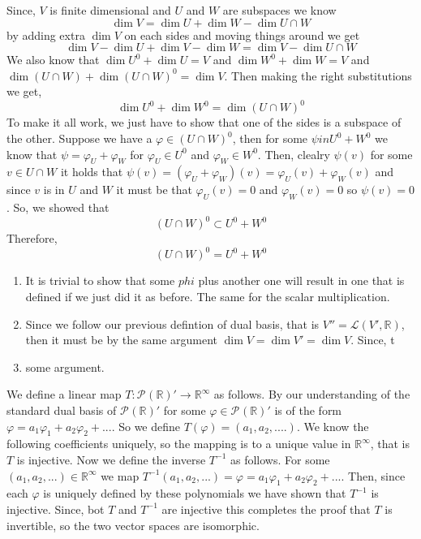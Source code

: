 \documentclass[10pt, twocolumn]{article}
\newcommand{\R}{\mathbb{R}}
\newcommand{\LinearMap}[2]{\mathcal{L}(#1, #2)}
\newcommand{\poly}[2]{\mathcal{P}_{#1}\left(#2\right)}
\newcommand{\inv}[1]{#1^{-1}}
\newcommand{\annhilator}[1]{#1^{0}}
\begin{document}
\begin{q}[23]
    Since, $ V $ is finite dimensional and $ U $ and $ W $ are subspaces we know 
    $$ \dim V = \dim U + \dim W - \dim U \cap W $$
    by adding extra $ \dim V $ on each sides and moving things around we get
    $$ \dim V - \dim U + \dim V - \dim W = \dim V - \dim U \cap W $$
    We also know that $ \dim \annhilator{U} + \dim U = V $ and $ \dim \annhilator{W} + \dim W = V $ and 
    $ \dim (U \cap W) + \dim \annhilator{(U \cap W)} = \dim V $. 
    Then making the right substitutions we get, 
    $$ \dim \annhilator{U} + \dim \annhilator{W} = \dim \annhilator{(U \cap W)} $$
    To make it all work, we just have to show that one of the sides is a subspace of the other. 
    Suppose we have a $ \varphi \in (U \cap W)^0 $, then for some $ \psi in U^0 + W^0 $ we know that $ \psi = \varphi_U + \varphi_W $ for $ \varphi_U \in \annhilator{U}  $ and $ \varphi_W \in \annhilator{W} $. 
    Then, clealry $ \psi(v) $ for some $ v\in U \cap W $ it holds that $ \psi(v) = (\varphi_U + \varphi_W)(v) = \varphi_U(v) + \varphi_W(v) $ and since $ v $ is in $ U $ and $ W $ it must be that $ \varphi_U(v) = 0 $ and $ \varphi_W(v) = 0 $ so $ \psi(v) = 0 $. 
    So, we showed that 
    $$ (U \cap W)^0  \subset U^0 + W^0 $$
    Therefore, 
    $$ (U \cap W)^0  = U^0 + W^0 $$
\end{q}
\begin{q}[34]
    \begin{enumerate}
        \item It is trivial to show that some $ phi $ plus another one will result in one that is defined if we just did it as before. The same for the scalar multiplication. 
        \item Since we follow our previous defintion of dual basis, that is $ V'' = \LinearMap{V'}{\R} $, then it must be by the same argument $ \dim V = \dim V' = \dim V $. Since, t
        \item some argument.
    \end{enumerate} 
\end{q}
\begin{q}[35]
    We define a linear map $ T : \poly{}{\R}' \to \R^\infty $ as follows. 
    By our understanding of the standard dual basis of $ \poly{}{\R}' $ for some $ \varphi \in \poly{}{\R}' $ is of the form $ \varphi = a_1 \varphi_1 + a_2 \varphi_2 + ... $. 
    So we define $ T(\varphi) = (a_1, a_2, ....) $. We know the following coefficients uniquely, so the mapping is to a unique value in $ \R^\infty $, that is $ T $ is injective. 
    Now we define the inverse $ \inv{T} $ as follows. 
    For some $ (a_1, a_2, ...) \in \R^\infty $ we map $ \inv{T} (a_1, a_2, ...) = \varphi = a_1 \varphi_1 + a_2 \varphi_2 + ... $. 
    Then, since each $ \varphi $ is uniquely defined by these polynomials we have shown that $ \inv{T} $ is injective. 
    Since, bot $ T $ and $ \inv{T} $ are injective this completes the proof that $ T $ is invertible, so the two vector spaces are isomorphic.
\end{q}
\end{document}
